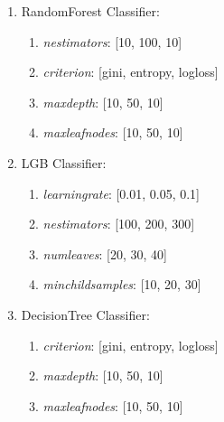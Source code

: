 \documentclass[12pt,a4paper,openright,twoside]{book}
\begin{document}
\begin{enumerate}
    
    \item RandomForest Classifier:
    
    \begin{enumerate}
       
        \item \emph{n\textunderscore estimators}: [10, 100, 10]
       
        \item \emph{criterion}: [gini, entropy, log\textunderscore loss]
       
        \item \emph{max\textunderscore depth}: [10, 50, 10]
       
        \item \emph{max\textunderscore leaf\textunderscore nodes}: [10, 50, 10]
    
    \end{enumerate}
    
    \item LGB Classifier:

    \begin{enumerate}

        \item \emph{learning\textunderscore rate}: [0.01, 0.05, 0.1]

        \item \emph{n\textunderscore estimators}: [100, 200, 300]

        \item \emph{num\textunderscore leaves}: [20, 30, 40]

        \item \emph{min\textunderscore child\textunderscore samples}: [10, 20, 30]

    \end{enumerate}
    
    \item DecisionTree Classifier:
    
    \begin{enumerate}
    
        \item \emph{criterion}: [gini, entropy, log\textunderscore loss]
    
        \item \emph{max\textunderscore depth}: [10, 50, 10]
    
        \item \emph{max\textunderscore leaf\textunderscore nodes}: [10, 50, 10]
    
    
    \end{enumerate}

\end{enumerate}
\end{document}
